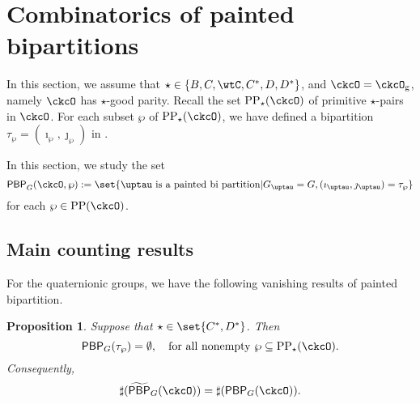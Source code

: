 \documentclass[12pt,a4paper]{amsart}
\def\subset{\subseteq}
\newcommand{\CO}{{\mathcal {O}}}
\numberwithin{equation}{section}
\newtheorem{prop}[thm]{Proposition}
\theoremstyle{remark}
\def\CPP{\mathrm{PP}}
\def\CPPs{\mathrm{PP}_{\star}}
\def\tPBP{\widetilde{\mathsf{PBP}}}
\def\PBP{\mathsf{PBP}}
\def\ckcOg{\ckcO_{\mathrm g}}
\def\tPBP{\widetilde{\mathsf{PBP}}}
\def\PBPop#1#2#3#4{\PBP_{#1}^{#2}(#3,#4)}
\def\PBPGOP{\PBPop{G}{}{\ckcO}{\wp}}
\begin{document}
\def\fhhaso{(\fhh^a_1)^*}
\def\fhhast{(\fhh^a_2)^*}
\newcommand{\ff}{f}
\newcommand{\ffcoh}{\varphi}

\section{Combinatorics of painted bipartitions}


In this section, we assume that $\star \in \{B,C,\wtC,C^{*},D,D^{*}\}$, and $\ckcO = \ckcOg$, namely $\ckcO $ has $\star$-good parity.
Recall the set  $\CPPs(\ckcO)$ of primitive $\star$-pairs in $\ckcO$. For each subset $\wp$ of $\CPPs(\ckcO)$, we have defined a bipartition $\tau_{\wp}=(\imath_{\wp},\jmath_{\wp})$ in .

In this section, we study the set
\[
\PBPGOP := \set{\uptau \text{ is a painted bi
    partition}| G_{\uptau}=G,  (\imath_{\uptau},\jmath_{\uptau}) = \tau_{\wp}}
\]
for each $\wp\in \CPP(\ckcO)$.


\subsection{Main counting results}
%

For the quaternionic groups, we have the following vanishing results of painted
bipartition.

\begin{prop} \label{prop:PBP1} Suppose that $\star\in \set{C^{*}, D^{*}}$. Then
\[
    \PBP_{G}(\tau_{\wp}) = \emptyset, \quad \text{for all nonempty $\wp\subset \CPPs(\ckcO)$.}
  \]
 Consequently,
     \[
     \sharp(\tPBP_{G}(\ckcO)) = \sharp(\PBP_{G}(\ckcO)).
  \]
\end{prop}
\end{document}
